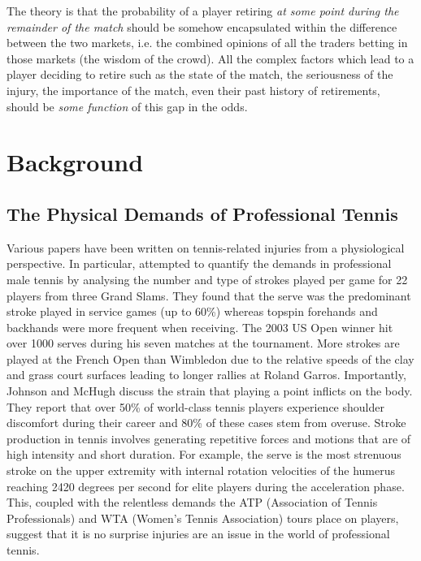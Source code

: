 \documentclass[letterpaper,12pt]{article}
\begin{document}
The theory is that the probability of a player retiring \textit{at some point during the remainder of the match} should be somehow encapsulated within the difference between the two markets, i.e. the combined opinions of all the traders betting in those markets (the wisdom of the crowd).  All the complex factors which lead to a player deciding to retire such as the state of the match, the seriousness of the injury, the importance of the match, even their past history of retirements, should be \textit{some function} of this gap in the odds.

\section{Background}

\subsection{The Physical Demands of Professional Tennis}

Various papers have been written on tennis-related injuries from a physiological perspective.  In particular, \cite{demands} attempted to quantify the demands in professional male tennis by analysing the number and type of strokes played per game for 22 players from three Grand Slams.  They found that the serve was the predominant stroke played in service games (up to 60\%) whereas topspin forehands and backhands were more frequent when receiving.  The 2003 US Open winner hit over 1000 serves during his seven matches at the tournament.  More strokes are played at the French Open than Wimbledon due to the relative speeds of the clay and grass court surfaces leading to longer rallies at Roland Garros.  Importantly, Johnson and McHugh discuss the strain that playing a point inflicts on the body.  They report that over 50\% of world-class tennis players experience shoulder discomfort during their career and 80\% of these cases stem from overuse.  Stroke production in tennis involves generating repetitive forces and motions that are of high intensity and short duration.  For example, the serve is the most strenuous stroke on the upper extremity with internal rotation velocities of the humerus reaching 2420 degrees per second for elite players during the acceleration phase.  This, coupled with the relentless demands the ATP (Association of Tennis Professionals) and WTA (Women's Tennis Association) tours place on players, suggest that it is no surprise injuries are an issue in the world of professional tennis.
\end{document}
